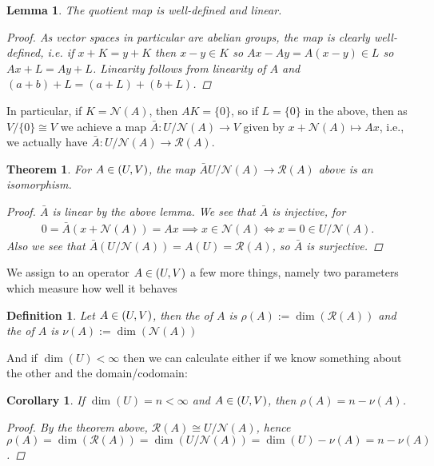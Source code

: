 \documentclass[10pt,twoside,openany,final]{memoir}
\theoremstyle{break}
\newtheorem{theorem}[section]{Theorem}
\newtheorem{lemma}[section]{Lemma}
\newtheorem{corollary}[section]{Corollary}
\newtheorem{definition}[section]{Definition}
\theoremstyle{Break}
\let\Hom\relax
\DeclareMathOperator{\Hom}{Hom}
\newcommand{\Rg}{\mathcal{R}}
\newcommand{\Nl}{\mathcal{N}}
\let\emph\relax
\begin{document}
\begin{lemma}
	The quotient map is well-defined and linear.
	\begin{proof}
		As vector spaces in particular are abelian groups, the map is clearly well-defined, i.e. if $x+K=y+K$ then $x-y \in K$ so $Ax-Ay=A(x-y)\in L$ so $Ax+L=Ay+L$. Linearity follows from linearity of $A$ and $(a+b)+L=(a+L)+(b+L)$.
	\end{proof}
\end{lemma}
In particular, if $K=\Nl(A)$, then $AK=\{0\}$, so if $L=\{0\}$ in the above, then as $V/\{0\}\cong V$ we achieve a map $\bar{A} \colon U / \Nl(A) \to V$ given by $x+\Nl(A) \mapsto Ax$, i.e., we actually have $\bar{A} \colon U/\Nl(A) \to \Rg(A)$.
\begin{theorem}
	For $A \in \Hom(U,V)$, the map $\bar{A} U / \Nl(A) \to \Rg(A)$ above is an isomorphism.
	\begin{proof}
		$\bar{A}$ is linear by the above lemma. We see that $\bar{A}$ is injective, for 
		\begin{align*}
			0=\bar{A}(x+\Nl(A))=Ax \implies x \in \Nl(A) \iff x=0 \in U/\Nl(A).
		\end{align*}
		Also we see that $\bar{A}(U/\Nl(A))=A(U)=\Rg(A)$, so $\bar{A}$ is surjective.
	\end{proof}
\end{theorem}
We assign to an operator $A \in \Hom(U,V)$ a few more things, namely two parameters which measure how well it behaves
\begin{definition}
	Let $A \in \Hom(U,V)$, then the \emph{Rank} of $A$ is $\rho(A):=\dim(\Rg(A))$ and the \emph{nullity} of $A$ is $\nu(A):=\dim(\Nl(A))$
\end{definition}
And if $\dim(U) < \infty$ then we can calculate either if we know something about the other and the domain/codomain:
\begin{corollary}
	If $\dim(U)=n< \infty$ and $A \in \Hom(U,V)$, then $\rho(A)=n-\nu(A)$.
\begin{proof}
	By the theorem above, $\Rg(A) \cong U/\Nl(A)$, hence $\rho(A) = \dim(\Rg(A))=\dim(U/\Nl(A))=\dim(U)-\nu(A)=n-\nu(A)$.
\end{proof}
\end{corollary}
\end{document}
